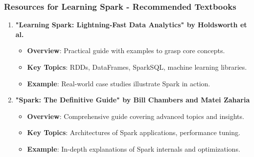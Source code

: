 \documentclass[aspectratio=169]{beamer}
\begin{document}
\begin{frame}[fragile]
    \frametitle{Resources for Learning Spark - Recommended Textbooks}
    \begin{enumerate}
        \item \textbf{"Learning Spark: Lightning-Fast Data Analytics" by Holdsworth et al.}
            \begin{itemize}
                \item \textbf{Overview}: Practical guide with examples to grasp core concepts.
                \item \textbf{Key Topics}: RDDs, DataFrames, SparkSQL, machine learning libraries.
                \item \textbf{Example}: Real-world case studies illustrate Spark in action.
            \end{itemize}
        \item \textbf{"Spark: The Definitive Guide" by Bill Chambers and Matei Zaharia}
            \begin{itemize}
                \item \textbf{Overview}: Comprehensive guide covering advanced topics and insights.
                \item \textbf{Key Topics}: Architectures of Spark applications, performance tuning.
                \item \textbf{Example}: In-depth explanations of Spark internals and optimizations.
            \end{itemize}
    \end{enumerate}
\end{frame}
\end{document}
